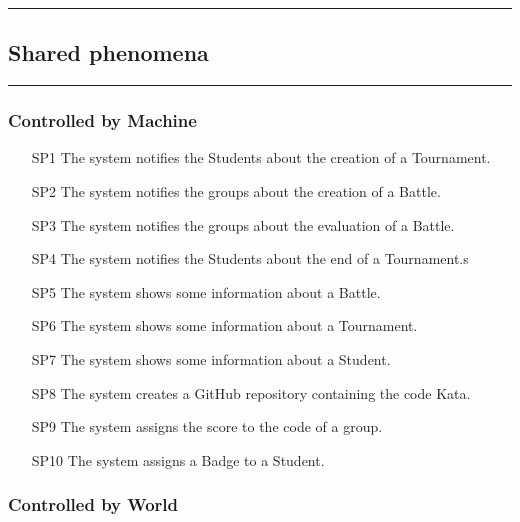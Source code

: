 \documentclass{Configuration_Files/Template}
\begin{document}
{\color{bluepoli}\rule{\linewidth}{0.1pt}}

\subsection{Shared phenomena}

{\color{bluepoli}\rule{\linewidth}{0.1pt}}

\subsubsection{Controlled by Machine}

\begin{enumerate}
    \item[\textcolor{bluepoli}{SP1}] The system notifies the Students about the creation of a Tournament.
    \item[\textcolor{bluepoli}{SP2}] The system notifies the groups about the creation of a Battle.
    \item[\textcolor{bluepoli}{SP3}] The system notifies the groups about the evaluation of a Battle.
    \item[\textcolor{bluepoli}{SP4}] The system notifies the Students about the end of a Tournament.s
    \item[\textcolor{bluepoli}{SP5}] The system shows some information about a Battle.
    \item[\textcolor{bluepoli}{SP6}] The system shows some information about a Tournament.
    \item[\textcolor{bluepoli}{SP7}] The system shows some information about a Student.
    \item[\textcolor{bluepoli}{SP8}] The system creates a GitHub repository containing the code Kata.
    \item[\textcolor{bluepoli}{SP9}] The system assigns the score to the code of a group.
    \item[\textcolor{bluepoli}{SP10}] The system assigns a Badge to a Student.
\end{enumerate}

\subsubsection{Controlled by World}
\end{document}
